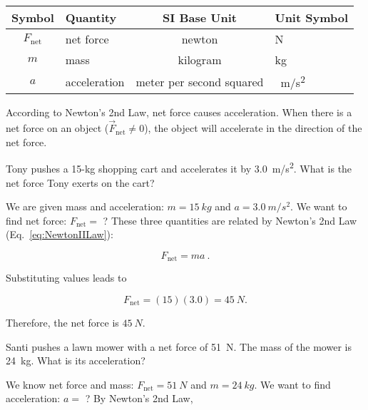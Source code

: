 \documentclass[main.tex]{subfiles}
\begin{document}
\begin{center}
    \begin{tabular}{cl|cl}
    \hline
    \textbf{Symbol} & \textbf{Quantity} & \textbf{SI Base Unit} & \textbf{Unit Symbol}  \\
    \hline\hline
    \rule{0pt}{2.5ex}
        $F_{\mathrm{net}}$ & net force & newton & N\\
        $m$ & mass & kilogram & kg\\
        $a$ & acceleration & meter per second squared & \SI{}{m/s^2}\\
    \hline
    \end{tabular}
\end{center}

According to Newton's 2nd Law, net force causes acceleration. When there is a net force on an object ($\vec{F}_{\text{net}} \neq 0$), the object will accelerate in the direction of the net force.


\begin{example} \label{ex:NetForce_Tony}
Tony pushes a 15-kg shopping cart and accelerates it by \SI{3.0}{m/s^2}. What is the net force Tony exerts on the cart?
\end{example}

\Solution We are given mass and acceleration: $m = \SI{15}{kg}$ and $a = \SI{3.0}{m/s^2}$. We want to find net force: $F_{\text{net}} =$ ? These three quantities are related by Newton's 2nd Law (Eq.~\ref{eq:NewtonIILaw}):

\begin{equation*}
    F_{\text{net}} = m a\ .
\end{equation*}

Substituting values leads to

\begin{equation*}
    F_{\text{net}} = (15)(3.0) = \SI{45}{N}.
\end{equation*}

Therefore, the net force is $\SI{45}{N}$. 

\solutionEnd

\begin{example} \label{ex:Solve_NIIL_a}
Santi pushes a lawn mower with a net force of \SI{51}{N}. The mass of the mower is \SI{24}{kg}. What is its acceleration?
\end{example}

\Solution We know net force and mass: $F_{\mathrm{net}} = \SI{51}{N}$ and $m = \SI{24}{kg}$. We want to find acceleration: $a =$ ? By Newton's 2nd Law,
\end{document}
